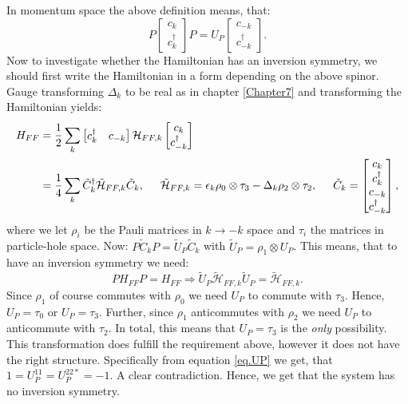 In momentum space the above definition means, that:
\begin{equation}
P\begin{bmatrix} c_k \\ c^\dagger_k \end{bmatrix} P = U_P\begin{bmatrix} c_{-k} \\ c^\dagger_{-k} \end{bmatrix}.
\end{equation}
Now to investigate whether the Hamiltonian has an inversion symmetry, we should first write the Hamiltonian in a form depending on the above spinor. Gauge transforming $\Delta_k$ to be real as in chapter \ref{Chapter7} and transforming the Hamiltonian yields:
\begin{align}
H_{FF} &= \frac{1}{2}\sum_k \begin{bmatrix} c_k^\dagger & c_{-k}\end{bmatrix}\mathcal{H}_{FF,k} \begin{bmatrix} c_k \\ c^\dagger_{-k}\end{bmatrix} \nonumber \\
	   &= \frac{1}{4}\sum_k \tilde{C}^\dagger_k \tilde{\mathcal{H}}_{FF,k} \tilde{C}_k, \hspace{0.5cm} \tilde{\mathcal{H}}_{FF,k} = \epsilon_k \rho_0 \otimes \tau_3 - \Delta_k \rho_2 \otimes \tau_2, \hspace{0.5cm} \tilde{C}_k = \begin{bmatrix} c_k \\ c^\dagger_{k} \\ c_{-k} \\ c^\dagger_{-k}\end{bmatrix}, 
\end{align}
where we let $\rho_i$ be the Pauli matrices in $k\to -k$ space and $\tau_i$ the matrices in particle-hole space. Now: $P\tilde{C}_kP = \tilde{U}_P \tilde{C}_k$ with $\tilde{U}_P = \rho_1\otimes U_P$. This means, that to have an inversion symmetry we need:
\begin{equation}
PH_{FF}P = H_{FF} \Rightarrow \tilde{U}_P\tilde{\mathcal{H}}_{FF,k}\tilde{U}_P = \tilde{\mathcal{H}}_{FF,k}. \nonumber 
\end{equation}
Since $\rho_1$ of course commutes with $\rho_0$ we need $U_P$ to commute with $\tau_3$. Hence, $U_P = \tau_0$ or $U_P = \tau_3$. Further, since $\rho_1$ anticommutes with $\rho_2$ we need $U_P$ to anticommute with $\tau_2$. In total, this means that $U_P = \tau_3$ is the \textit{only} possibility. This transformation does fulfill the requirement above, however it does not have the right structure. Specifically from equation \ref{eq.UP} we get, that $1 = U_P^{11} = U_P^{22*} = -1$. A clear contradiction. Hence, we get that the system has no inversion symmetry. 

